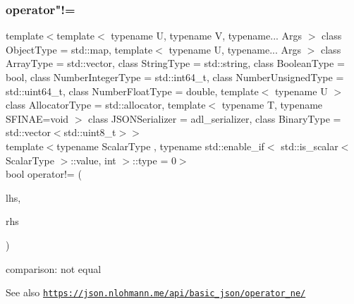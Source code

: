 \subsubsection{\texorpdfstring{operator"!=}{operator!=}\hspace{0.1cm}{\footnotesize\ttfamily [2/3]}}
{\footnotesize\ttfamily template$<$template$<$ typename U, typename V, typename... Args $>$ class Object\+Type = std\+::map, template$<$ typename U, typename... Args $>$ class Array\+Type = std\+::vector, class String\+Type  = std\+::string, class Boolean\+Type  = bool, class Number\+Integer\+Type  = std\+::int64\+\_\+t, class Number\+Unsigned\+Type  = std\+::uint64\+\_\+t, class Number\+Float\+Type  = double, template$<$ typename U $>$ class Allocator\+Type = std\+::allocator, template$<$ typename T, typename S\+F\+I\+N\+A\+E=void $>$ class J\+S\+O\+N\+Serializer = adl\+\_\+serializer, class Binary\+Type  = std\+::vector$<$std\+::uint8\+\_\+t$>$$>$ \\
template$<$typename Scalar\+Type , typename std\+::enable\+\_\+if$<$ std\+::is\+\_\+scalar$<$ Scalar\+Type $>$\+::value, int $>$\+::type  = 0$>$ \\
bool operator!= (\begin{DoxyParamCaption}\item[{\hyperlink{classnlohmann_1_1basic__json_ab8a1c33ee7b154fc41ca2545aa9724e6}{const\+\_\+reference}}]{lhs,  }\item[{Scalar\+Type}]{rhs }\end{DoxyParamCaption})\hspace{0.3cm}{\ttfamily [friend]}}



comparison\+: not equal 

\begin{DoxySeeAlso}{See also}
\href{https://json.nlohmann.me/api/basic_json/operator_ne/}{\tt https\+://json.\+nlohmann.\+me/api/basic\+\_\+json/operator\+\_\+ne/} 
\end{DoxySeeAlso}
\mbox{\label{classnlohmann_1_1basic__json_aa9861979059799375c0fff68174610ba}} 
